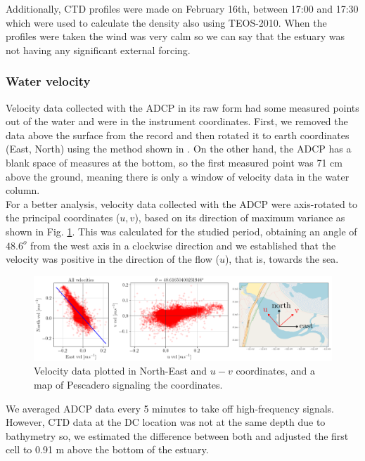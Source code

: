 \documentclass[tesis.tex]{subfiles}
\begin{document}
Additionally, CTD profiles were made on February 16th, between 17:00 and 17:30 which were used to calculate the density also using TEOS-2010. When the profiles were taken the wind was very calm so we can say that the estuary was not having any significant external forcing. \\

\subsubsection{Water velocity} \label{Estuary_currents}

Velocity data collected with the ADCP in its raw form had some measured points out of the water and were in the instrument coordinates. First, we removed the data above the surface from the record and then rotated it to earth coordinates (East, North) using the method shown in \cite{teledyne2008}. On the other hand, the ADCP has a blank space of measures at the bottom, so the first measured point was 71 cm above the ground, meaning there is only a window of velocity data in the water column.\\

For a better analysis, velocity data collected with the ADCP were axis-rotated to the principal coordinates ($u,v$), based on its direction of maximum variance as shown in Fig. \ref{fig:rotacion}. This was calculated for the studied period, obtaining an angle of $48.6^o$ from the west axis in a clockwise direction and we established that the velocity was positive in the direction of the flow ($u$), that is, towards the sea.  

\begin{figure}[h!]
    \centering
    \includegraphics[width=\textwidth]{Imagenes/rotacion.png}
    \caption{Velocity data plotted in North-East and $u-v$ coordinates, and a map of Pescadero signaling the coordinates.}
    \label{fig:rotacion}
\end{figure}

We averaged ADCP data every 5 minutes to take off high-frequency signals. However, CTD data at the DC location was not at the same depth due to bathymetry so, we estimated the difference between both and adjusted the first cell to 0.91 m above the bottom of the estuary. 
\end{document}
